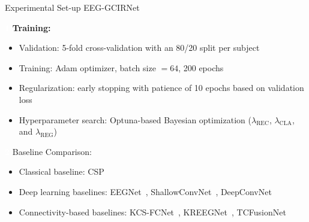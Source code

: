 \documentclass[aspectratio=169]{beamer}
\let\oldcite\cite
\renewcommand{\cite}[1]{{\tiny\oldcite{#1}}}
\begin{document}

\begin{frame}{Experimental Set-up EEG-GCIRNet}

\setlength{\leftmargini}{1.4em}
\setlength{\leftmarginii}{1.2em}
\setlength{\fboxsep}{1.2pt}

\vspace{0.35cm}

\noindent
\colorbox{frameblue}{\textcolor{white}{\textbf{\scriptsize 1}}}
\hspace{0.12cm}
\textbf{\normalsize Training:}

\vspace{0.04cm}

\begin{itemize}\itemsep2pt

    \item Validation: 5-fold cross-validation with an 80/20 split per subject
    \item Training: Adam optimizer, batch size $=64$, 200 epochs
    \item {Regularization:} early stopping with patience of 10 epochs based on validation loss
    \item {Hyperparameter search:} Optuna-based Bayesian optimization ($\lambda_{\mathrm{REC}}$, $\lambda_{\mathrm{CLA}}$, and $\lambda_{\mathrm{REG}}$)

\end{itemize}

\vspace{0.12cm}

\noindent \colorbox{frameblue}{\textcolor{white}{\textbf{\scriptsize 2}}} \hspace{0.12cm} {\normalsize Baseline Comparison:} \vspace{0.04cm} \begin{itemize}\itemsep2pt \item {Classical baseline:} CSP~\cite{ang2008filter}
\item {Deep learning baselines:} EEGNet~\cite{lawhern2018eegnet}, ShallowConvNet~\cite{Kim2022}, DeepConvNet~\cite{schirrmeister2017deep} 
\item {Connectivity-based baselines:} KCS-FCNet~\cite{diagnostics13061122}, KREEGNet~\cite{tobon2023kreegnet}, TCFusionNet~\cite{Musallam2021} \end{itemize} \vspace{0.12cm}

\end{frame}
\end{document}
